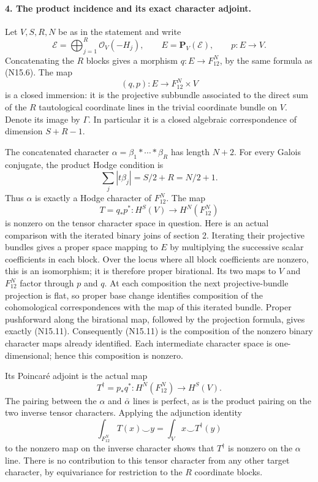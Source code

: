 \paragraph{4. The product incidence and its exact character adjoint.}
Let $V,S,R,N$ be as in the statement and write
\[
 \mathcal E=\bigoplus_{j=1}^R\mathcal O_V(-H_j),\qquad
 E=\mathbf P_V(\mathcal E),\qquad p:E\to V.
\]
Concatenating the $R$ blocks gives a morphism
$q:E\to F_{12}^N$, by the same formula as (N15.6).
The map
\[
                (q,p):E\longrightarrow F_{12}^N\times V
                                                        \tag{N15.10}
\]
is a closed immersion: it is the projective subbundle associated
to the direct sum of the $R$ tautological coordinate lines in
the trivial coordinate bundle on $V$.
Denote its image by $\Gamma$.  In particular it is a closed
algebraic correspondence of dimension $S+R-1$.

The concatenated character
$\alpha=\beta_1*\cdots*\beta_R$ has length $N+2$.
For every Galois conjugate, the product Hodge condition is
\[
 \sum_j|t\beta_j|=S/2+R=N/2+1.
\]
Thus $\alpha$ is exactly a Hodge character of $F_{12}^N$.
The map
\[
 T=q_*p^*:H^S(V)\longrightarrow H^N(F_{12}^N)
                                                        \tag{N15.11}
\]
is nonzero on the tensor character space in question.
Here is an actual comparison with the iterated binary joins
of section 2.  Iterating their projective bundles gives a
proper space mapping to $E$ by multiplying the successive
scalar coefficients in each block.  Over the locus where all
block coefficients are nonzero, this is an isomorphism; it is
therefore proper birational.  Its two maps to $V$ and
$F_{12}^N$ factor through $p$ and $q$.
At each composition the next projective-bundle projection is
flat, so proper base change identifies composition of the
cohomological correspondences with the map of this iterated
bundle.  Proper pushforward along the birational map, followed
by the projection formula, gives exactly (N15.11).
Consequently (N15.11) is the composition of the nonzero binary
character maps already identified.  Each intermediate character
space is one-dimensional; hence this composition is nonzero.

Its Poincar\'e adjoint is the actual map
\[
 T^\dagger=p_*q^*:H^N(F_{12}^N)\longrightarrow H^S(V).
                                                        \tag{N15.12}
\]
The pairing between the $\alpha$ and $\bar\alpha$ lines is
perfect, as is the product pairing on the two inverse tensor
characters.  Applying the adjunction identity
\[
 \int_{F_{12}^N}T(x)\smile y
                   =\int_Vx\smile T^\dagger(y)
\]
to the nonzero map on the inverse character shows that
$T^\dagger$ is nonzero on the $\alpha$ line.
There is no contribution to this tensor character from any
other target character, by equivariance for restriction to
the $R$ coordinate blocks.

